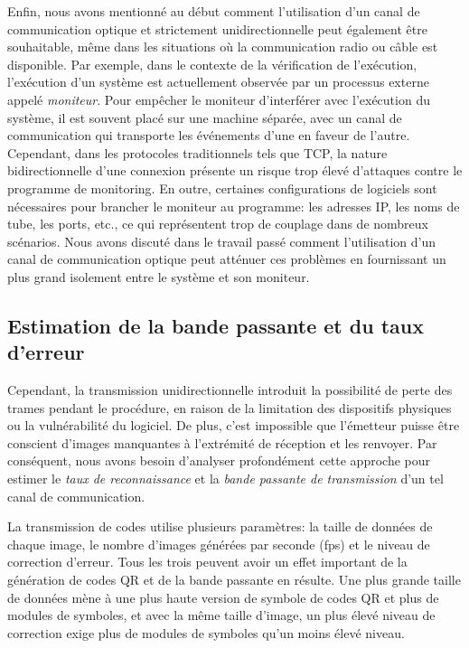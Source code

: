 Enfin, nous avons mentionné au début comment l'utilisation d'un canal de communication optique et strictement unidirectionnelle peut également être souhaitable, même dans les situations où la communication radio ou câble est disponible. Par exemple, dans le contexte de la vérification de l'exécution, l'exécution d'un système est actuellement observée par un processus externe appelé \emph{moniteur}. Pour empêcher le moniteur d'interférer avec l'exécution du système, il est souvent placé sur une machine séparée, avec un canal de communication qui transporte les événements d'une en faveur de l'autre. Cependant, dans les protocoles traditionnels tels que TCP, la nature bidirectionnelle d'une connexion présente un risque trop élevé d'attaques contre le programme de monitoring. En outre, certaines configurations de logiciels sont nécessaires pour brancher le moniteur au programme: les adresses IP, les noms de tube, les ports, etc., ce qui représentent trop de couplage dans de nombreux scénarios. Nous avons discuté dans le travail passé \citep{DBLP_conf /rv/LavoieLVGH14} comment l'utilisation d'un canal de communication optique peut atténuer ces problèmes en fournissant un plus grand isolement entre le système et son moniteur.

\subsection{Estimation de la bande passante et du taux d'erreur}

Cependant, la transmission unidirectionnelle introduit la possibilité de perte des trames pendant le procédure, en raison de la limitation des dispositifs physiques ou la vulnérabilité du logiciel. De plus, c'est impossible que l'émetteur puisse être conscient d'images manquantes à l'extrémité de réception et les renvoyer. Par conséquent, nous avons besoin d'analyser profondément cette approche pour estimer le \emph{taux de reconnaissance} et la \emph{bande passante de transmission} d'un tel canal de communication.

La transmission de codes utilise plusieurs paramètres: la taille de données de chaque image, le nombre d'images générées par seconde (fps) et le niveau de correction d'erreur. Tous les trois peuvent avoir un effet important de la génération de codes QR et de la bande passante en résulte. Une plus grande taille de données mène à une plus haute version de symbole de codes QR et plus de modules de symboles, et avec la même taille d'image, un plus élevé niveau de correction exige plus de modules de symboles qu'un moins élevé niveau.


